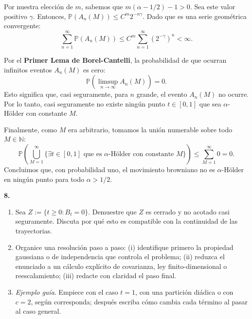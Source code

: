 \documentclass[11pt, letterpaper]{article}
\begin{document}
\begin{solucion}
    Por nuestra elección de $m$, sabemos que $m(\alpha - 1/2) - 1 > 0$. Sea este valor positivo $\gamma$.
    Entonces, $\mathbb{P}(A_n(M)) \le C^m 2^{-n\gamma}$.
    Dado que es una serie geométrica convergente:
    \[ \sum_{n=1}^\infty \mathbb{P}(A_n(M)) \le C^m \sum_{n=1}^\infty (2^{-\gamma})^n < \infty. \]
    
    Por el \textbf{Primer Lema de Borel-Cantelli}, la probabilidad de que ocurran infinitos eventos $A_n(M)$ es cero:
    \[ \mathbb{P}(\limsup_{n \to \infty} A_n(M)) = 0. \]
    Esto significa que, casi seguramente, para $n$ grande, el evento $A_n(M)$ no ocurre. Por lo tanto, casi seguramente no existe ningún punto $t \in [0,1]$ que sea $\alpha$-Hölder con constante $M$.
    
    Finalmente, como $M$ era arbitrario, tomamos la unión numerable sobre todo $M \in \mathbb{N}$:
    \[ \mathbb{P}\left( \bigcup_{M=1}^\infty \{\exists t \in [0,1] \text{ que es } \alpha\text{-H\"older con constante } M\} \right) \le \sum_{M=1}^\infty 0 = 0. \]
    Concluimos que, con probabilidad uno, el movimiento browniano no es $\alpha$-Hölder en ningún punto para todo $\alpha > 1/2$.
\end{solucion}

\newpage

\begin{ejercicio}
    \textbf{8.} 
    \begin{enumerate}
        \item Sea $Z := \{t \ge 0 : B_t = 0\}$. Demuestre que $Z$ es cerrado y no acotado casi seguramente. Discuta por qué esto es compatible con la continuidad de las trayectorias.
        \item Organice una resolución paso a paso: (i) identifique primero la propiedad gaussiana o de independencia que controla el problema; (ii) reduzca el enunciado a un cálculo explícito de covarianza, ley finito-dimensional o reescalamiento; (iii) redacte con claridad el paso final.
        \item \textit{Ejemplo guía}. Empiece con el caso $t = 1$, con una partición diádica o con $c = 2$, según corresponda; después escriba cómo cambia cada término al pasar al caso general.
    \end{enumerate}
\end{ejercicio}

\vspace{5mm}
\end{document}
